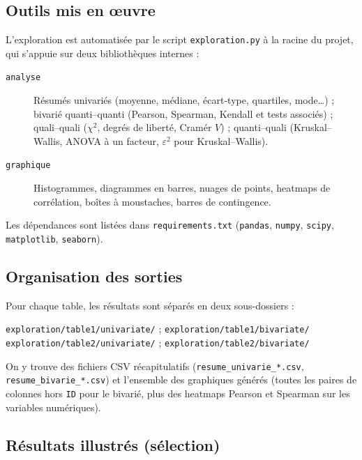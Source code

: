 \documentclass[11pt,a4paper]{article}
\begin{document}
\subsection{Outils mis en œuvre}

L'exploration est automatisée par le script \texttt{exploration.py} à la racine du projet, qui s'appuie sur deux bibliothèques internes :

\begin{description}
  \item[\texttt{analyse}] Résumés univariés (moyenne, médiane, écart-type, quartiles, mode\ldots) ; bivarié quanti--quanti (Pearson, Spearman, Kendall et tests associés) ; quali--quali ($\chi^2$, degrés de liberté, Cramér $V$) ; quanti--quali (Kruskal--Wallis, ANOVA à un facteur, $\varepsilon^2$ pour Kruskal--Wallis).
  \item[\texttt{graphique}] Histogrammes, diagrammes en barres, nuages de points, heatmaps de corrélation, boîtes à moustaches, barres de contingence.
\end{description}

Les dépendances sont listées dans \texttt{requirements.txt} (\texttt{pandas}, \texttt{numpy}, \texttt{scipy}, \texttt{matplotlib}, \texttt{seaborn}).

\subsection{Organisation des sorties}

Pour chaque table, les résultats sont séparés en deux sous-dossiers :

\begin{center}
\texttt{exploration/table1/univariate/} \quad ; \quad \texttt{exploration/table1/bivariate/} \\
\texttt{exploration/table2/univariate/} \quad ; \quad \texttt{exploration/table2/bivariate/}
\end{center}

\noindent On y trouve des fichiers CSV récapitulatifs (\texttt{resume\_univarie\_*.csv}, \texttt{resume\_bivarie\_*.csv}) et l'ensemble des graphiques générés (toutes les paires de colonnes hors \texttt{ID} pour le bivarié, plus des heatmaps Pearson et Spearman sur les variables numériques).

\subsection{Résultats illustrés (sélection)}
\end{document}
